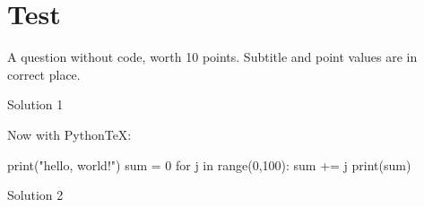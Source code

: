\documentclass{article}
\begin{document}
\section{Test}

\begin{exercise}[subtitle = Codeless Question,points=10]
  A question without code, worth 10 points. Subtitle and point values are in
  correct place.
\end{exercise}
\begin{solution}
  Solution 1
\end{solution}

\begin{exercise}[subtitle = Codeful Question,points=15]
Now with PythonTeX:
\begin{pyblock}
print("hello, world!")
sum = 0
for j in range(0,100):
    sum += j
print(sum)
\end{pyblock}
\end{exercise}
\begin{solution}
  Solution 2
\end{solution}
\end{document}
